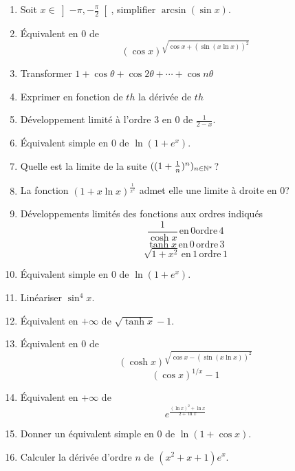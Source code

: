 

\begin{enumerate}
\item  Soit $x\in \left] -\pi ,-\frac{\pi }{2}\right[ $, simplifier $\arcsin(\sin x)$.\bigskip \bigskip
\item  {\'E}quivalent en 0 de \[(\cos x)^{\sqrt{\cos x+(\sin (x\ln x))^{2}}} \]
\bigskip \bigskip
\item  Transformer $1+\cos \theta +\cos 2\theta +\cdots +\cos n\theta $\bigskip \bigskip \bigskip
\item  Exprimer en fonction de $th$ la d{\'e}riv{\'e}e de $th$\bigskip\bigskip
\item  D{\'e}veloppement limit{\'e} {\`a} l'ordre 3 en 0 de $\frac{1}{2-x}$.\bigskip \bigskip
\item  {\'E}quivalent simple en $0$ de $\ln (1+e^{x}).$\bigskip \bigskip
\item  Quelle est la limite de la suite $((1+\frac{1}{n})^{n})_{n\in  \Bbb{N}^{*}}$?\bigskip
\item  La fonction $(1+x\ln x)^{\frac{1}{x^{2}}}$ admet elle une limite {\`a} droite en 0?\bigskip \bigskip
\item  D{\'e}veloppements limit{\'e}s des fonctions aux ordres indiqu{\'e}s
\[\frac{1}{\cosh x} \,\mathrm{en}\, 0\mathrm{ordre}\, 4\]
\bigskip \bigskip
\[\tanh x \,\mathrm{en}\,0\, \mathrm{ordre}\,3\]
\bigskip \bigskip
\[\sqrt{1+x^{2}} \,\mathrm{en}\, 1\,\mathrm{ordre}\, 1\]
\bigskip \bigskip \bigskip
\item  {\'E}quivalent simple en $0$ de $\ln (1+e^{x}).$\bigskip \bigskip
\item  Lin{\'e}ariser $\sin ^{4}x$.\bigskip \bigskip
\item  {\'E}quivalent en $+\infty $ de $\sqrt{\tanh x}-1$.\bigskip \bigskip
\item  {\'E}quivalent en 0 de \[(\cosh x)^{\sqrt{\cos x-(\sin (x\ln x))^{2}}}\]
\bigskip \bigskip
\[(\cos x)^{1/x}-1\]
\bigskip \bigskip
\item  {\'E}quivalent en +$\infty $ de \[e^{\frac{(\ln x)^{2}+\ln x}{2+\ln x}} \]
\item Donner un {\'e}quivalent simple en $0$ de $\ln (1+\cos x).$ \bigskip \bigskip
\item  Calculer la d{\'e}riv{\'e}e d'ordre $n$ de $(x^{2}+x+1)e^{x}$.\bigskip\bigskip


\end{enumerate}
